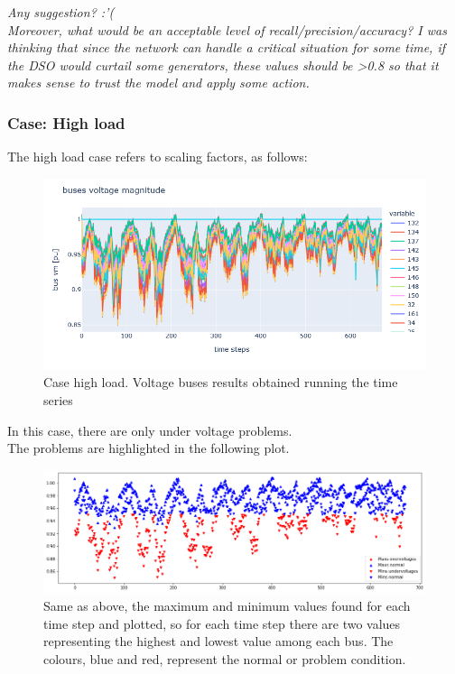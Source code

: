 \noindent \emph{Any suggestion? :'( \\ Moreover, what would be an acceptable level of recall/precision/accuracy? I was thinking that since the network can handle a critical situation for some time, if the DSO would curtail some generators, these values should be >0.8 so that it makes sense to trust the model and apply some action.} \label{q:evaluation}

\newpage
\subsubsection{Case: High load}
The high load case refers to scaling factors, as follows:
\begin{algorithm}[h]
    
\end{algorithm}

\begin{figure}[h]
\centering
    \includegraphics[width=.7\linewidth]{images/MVOberr/High load.png}
\caption{Case high load. Voltage buses results obtained running the time series}
\label{fig:gym_anm_net}
\end{figure}

In this case, there are only under voltage problems. \\
The problems are highlighted in the following plot.

\begin{figure}[h]
\centering
    \includegraphics[width=.8\linewidth]{images/MVOberr/High load problems.png}
    \caption{Same as above, the maximum and minimum values found for each time step and plotted, so for each time step there are two values representing the highest and lowest value among each bus. The colours, blue and red, represent the normal or problem condition.}
\end{figure}